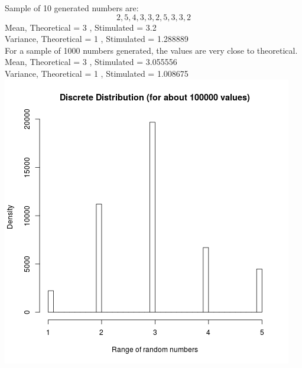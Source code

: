 \documentclass{article}
\begin{document}
Sample of 10 generated numbers are:
$$2, 5, 4, 3, 3, 2, 5, 3, 3, 2$$
Mean, Theoretical =  3 , Stimulated =  3.2 \\
Variance, Theoretical =  1 , Stimulated =  1.288889\\

For a sample of 1000 numbers generated, the values are very close to theoretical.\\
Mean, Theoretical =  3 , Stimulated =  3.055556 \\
Variance, Theoretical =  1 , Stimulated =  1.008675 \\

\includegraphics{"plot3b"}

\pagebreak
\end{document}
